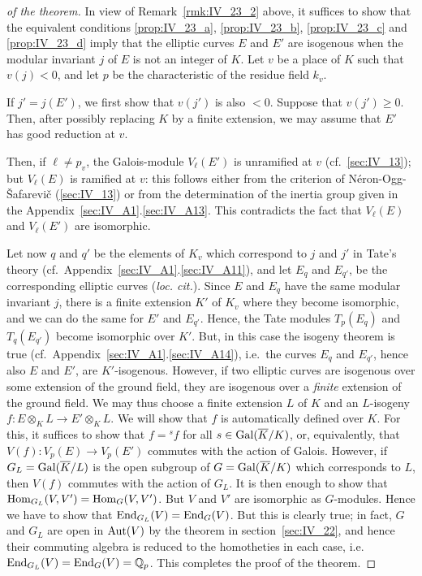 \begin{proof}[ of the theorem]
In view of Remark~\ref{rmk:IV_23_2} above, it suffices to show that the
equivalent conditions \ref{prop:IV_23_a}, \ref{prop:IV_23_b},
\ref{prop:IV_23_c} and \ref{prop:IV_23_d} imply that the elliptic curves $E$
and $E'$ are isogenous when the modular invariant $j$ of $E$ is not an integer
of $K$. Let $v$ be a place of $K$ such that $v(j) < 0$, and let $p$ be the
characteristic of the residue field $k_v$.

If $j' = j(E')$, we first show that $v(j')$ is also $< 0$. Suppose
that $v(j') \ge 0$. Then, after possibly replacing $K$ by a finite
extension, we may assume that $E'$ has good reduction at $v$.

Then, if $\ell \ne p_v$, the Galois-module $V_\ell(E')$ is unramified at $v$
(cf.\ \ref{sec:IV_13}); but $V_\ell(E)$ is ramified at $v$: this follows either
from the criterion of Néron-Ogg-\v Safarevi\v c (\ref{sec:IV_13}) or from the
determination of the inertia group given in the
Appendix~\ref{sec:IV_A1}.\ref{sec:IV_A13}. This contradicts the fact that
$V_\ell(E)$ and $V_\ell(E')$ are isomorphic.

Let now $q$ and $q'$ be the elements of $K_v$ which correspond to $j$ and $j'$
in Tate's theory (cf.\ Appendix~\ref{sec:IV_A1}.\ref{sec:IV_A11}), and let
$E_q$ and $E_{q'}$, be the corresponding elliptic curves (\emph{loc. cit.}).
Since $E$ and $E_q$ have the same modular invariant $j$, there is a finite
extension $K'$ of $K_v$ where they become isomorphic, and we can do the same
for $E'$ and $E_{q'}$. Hence, the Tate modules $T_p(E_q)$ and $T_q(E_{q'})$
become isomorphic over $K'$. But, in this case the isogeny
\dpage
theorem is true (cf.\ Appendix~\ref{sec:IV_A1}.\ref{sec:IV_A14}), i.e.\ the
curves $E_q$ and $E_{q'}$, hence also $E$ and $E'$, are $K'$-isogenous.
However, if two elliptic curves are isogenous over some extension of the ground
field, they are isogenous over a \emph{finite} extension of the ground field.
We may thus choose a finite extension $L$ of $K$ and an $L$-isogeny $f\colon E
\otimes_K L \to E' \otimes_K L$. We will show that $f$ is automatically defined
over $K$. For this, it suffices to show that $f = {}^sf$ for all
$s\in\operatorname{Gal}(\overline{K}/K)$, or, equivalently, that $V(f)\colon V_p(E) \to V_p(E')$
commutes with the action of Galois. However, if $G_L = \operatorname{Gal}(\overline{K}/L)$ is
the open subgroup of $G = \operatorname{Gal}(\overline{K}/K)$ which corresponds to $L$, then
$V(f)$ commutes with the action of $G_L$. It is then enough to show that
$\operatorname{Hom}_{G_L}(V, V') = \operatorname{Hom}_G(V, V')$. But $V$ and $V'$ are isomorphic as
$G$-modules. Hence we have to show that $\operatorname{End}_{G_L}(V) = \operatorname{End}_G(V)$. But
this is clearly true; in fact, $G$ and $G_L$ are open in $\operatorname{Aut}(V)$ by the
theorem in section~\ref{sec:IV_22}\label{errata:wrongsec}, and hence their
commuting algebra is reduced to the homotheties in each case, i.e.\
$\operatorname{End}_{G_L}(V) = \operatorname{End}_G(V) = \mathbb{Q}_p$.
This completes the proof of the theorem.
\end{proof}

